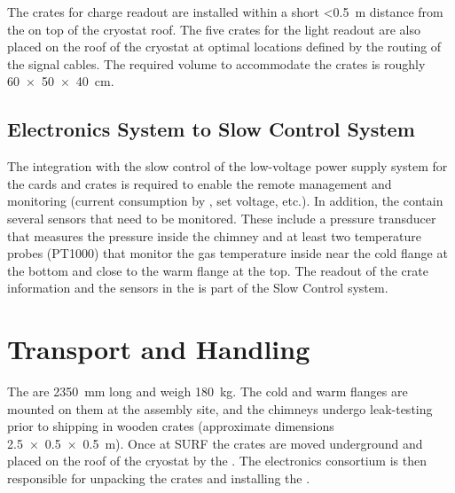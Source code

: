 The  crates for charge readout %
are installed within a short \SI{<0.5}{\meter} distance from the  on top of the cryostat roof. The five  crates for the light readout are also placed on the roof of the cryostat at optimal locations defined by the routing of the  signal cables. The required volume to accommodate the crates is roughly \SI[product-units=power]{60x50x40}{\cm}. 

\subsection{Electronics System to Slow Control System}
\label{sec:fddp-tpc-elec-intfc-sc}

The integration with the slow control of the low-voltage power supply system for the  cards and  crates is required to enable the remote management and monitoring (current consumption by , set voltage, etc.). In addition, the  contain several sensors that need to be monitored. These include a pressure transducer that measures the pressure inside the chimney and at least two temperature probes (PT1000) that monitor the gas temperature inside near the cold flange at the bottom and close to the warm flange at the top. The readout of the  crate information and the sensors in the  is part of the Slow Control system.

\section{Transport and Handling}
\label{sec:fddp-tpc-elec-install-transport}

The  are \SI{2350}{\mm} long %
and weigh \SI{180}{\kg}.  The cold and warm flanges are mounted on them at the assembly site, and the chimneys undergo leak-testing prior to shipping in wooden crates (approximate dimensions \SI[product-units=power]{2.5x0.5x0.5}{m}). %
Once at SURF the crates are moved underground and placed on the roof of the cryostat by the . The %
\dual electronics consortium %
is then responsible for unpacking the crates and installing the . 

